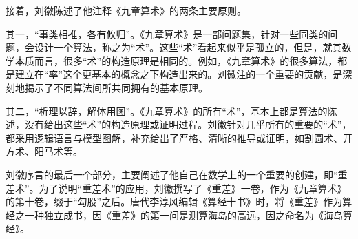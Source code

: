 \documentclass[a4paper,12pt,UTF8,twoside]{ctexbook}
\begin{document}
接着，刘徽陈述了他注释《九章算术》的两条主要原则。

其一，“事类相推，各有攸归”。《九章算术》是一部问题集，针对一些同类的问题，会设计一个算法，称之为“术”。这些“术”看起来似乎是孤立的，但是，就其数学本质而言，很多“术”的构造原理是相同的。例如，《九章算术》的很多算法，都是建立在“率”这个更基本的概念之下构造出来的。刘徽注的一个重要的贡献，是深刻地揭示了不同算法间所共同拥有的基本原理。

其二，“析理以辞，解体用图”。《九章算术》的所有“术”，基本上都是算法的陈述，没有给出这些“术”的构造原理或证明过程。刘徽针对几乎所有的重要的“术”，都采用逻辑语言与模型图解，补充给出了严格、清晰的推导或证明，如割圆术、开方术、阳马术等。

刘徽序言的最后一个部分，主要阐述了他自己在数学上的一个重要的创建，即“重差术”。为了说明“重差术”的应用，刘徽撰写了《重差》一卷，作为《九章算术》的第十卷，缀于“勾股”之后。唐代李淳风编辑《算经十书》时，将《重差》作为算经之一种独立成书，因《重差》的第一问是测算海岛的高远，因之命名为《海岛算经》。
\end{document}
